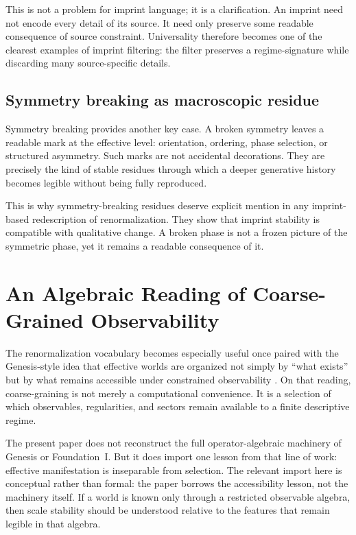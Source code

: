 \documentclass[12pt]{article}
\begin{document}
This is not a problem for imprint language; it is a clarification. An imprint need not encode every detail of its source. It need only preserve some readable consequence of source constraint. Universality therefore becomes one of the clearest examples of imprint filtering: the filter preserves a regime-signature while discarding many source-specific details.

\subsection{Symmetry breaking as macroscopic residue}

Symmetry breaking provides another key case. A broken symmetry leaves a readable mark at the effective level: orientation, ordering, phase selection, or structured asymmetry. Such marks are not accidental decorations. They are precisely the kind of stable residues through which a deeper generative history becomes legible without being fully reproduced.

This is why symmetry-breaking residues deserve explicit mention in any imprint-based redescription of renormalization. They show that imprint stability is compatible with qualitative change. A broken phase is not a frozen picture of the symmetric phase, yet it remains a readable consequence of it.

\section{An Algebraic Reading of Coarse-Grained Observability}

The renormalization vocabulary becomes especially useful once paired with the Genesis-style idea that effective worlds are organized not simply by ``what exists'' but by what remains accessible under constrained observability \cite{HAFFA,FoundationI}. On that reading, coarse-graining is not merely a computational convenience. It is a selection of which observables, regularities, and sectors remain available to a finite descriptive regime.

The present paper does not reconstruct the full operator-algebraic machinery of Genesis or Foundation~I. But it does import one lesson from that line of work: effective manifestation is inseparable from selection. The relevant import here is conceptual rather than formal: the paper borrows the accessibility lesson, not the machinery itself. If a world is known only through a restricted observable algebra, then scale stability should be understood relative to the features that remain legible in that algebra.
\end{document}
